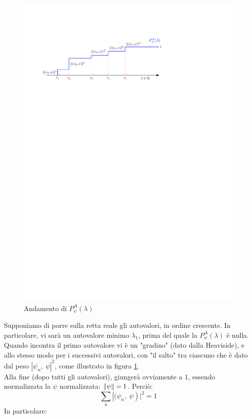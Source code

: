\begin{figure}
    \centering
    \includegraphics{Immagini/Heaviside.pdf}
    \caption{Andamento di $P_\psi^A(\lambda)$}
    \label{fig:Pautov}
\end{figure}
Supponiamo di porre sulla retta reale gli autovalori, in ordine crescente. In particolare, vi sarà un autovalore minimo $\lambda_1$, prima del quale la $P_\psi^A\left(\lambda\right)$ è nulla. Quando incontra il primo autovalore vi è un "gradino" (dato dalla Heaviside), e allo stesso modo per i successivi autovalori, con "il salto" tra ciascuno che è dato dal peso $\left|\psi_n,\ \psi\right|^2$, come illustrato in figura \ref{fig:Pautov}.\\
Alla fine (dopo tutti gli autovalori), giungerà ovviamente a $1$, essendo normalizzata la $\psi$ normalizzata: $\left\lVert\psi\right\rVert=1$. Perciò:
\[
\sum_{n}\left|(\psi_n,\ \psi\right)|^2=1
\]
In particolare:
